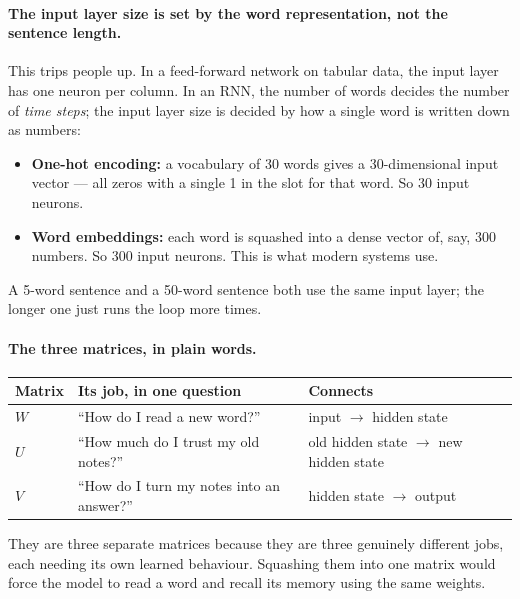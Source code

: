 \documentclass[11pt,a4paper]{article}
\begin{document}
\paragraph{The input layer size is set by the word representation, not the sentence length.}
This trips people up. In a feed-forward network on tabular data, the input layer has one
neuron per column. In an RNN, the number of words decides the number of \emph{time steps};
the input layer size is decided by how a single word is written down as numbers:
\begin{itemize}
\item \textbf{One-hot encoding:} a vocabulary of 30 words gives a 30-dimensional input
  vector --- all zeros with a single 1 in the slot for that word. So 30 input neurons.
\item \textbf{Word embeddings:} each word is squashed into a dense vector of, say, 300
  numbers. So 300 input neurons. This is what modern systems use.
\end{itemize}
A 5-word sentence and a 50-word sentence both use the same input layer; the longer one just
runs the loop more times.

\paragraph{The three matrices, in plain words.}
\begin{center}
\begin{tabularx}{\textwidth}{lYY}
\textbf{Matrix} & \textbf{Its job, in one question} & \textbf{Connects} \\
\hline
$W$ & ``How do I read a new word?'' & input $\rightarrow$ hidden state \\
$U$ & ``How much do I trust my old notes?'' & old hidden state $\rightarrow$ new hidden state \\
$V$ & ``How do I turn my notes into an answer?'' & hidden state $\rightarrow$ output \\
\end{tabularx}
\end{center}
They are three separate matrices because they are three genuinely different jobs, each
needing its own learned behaviour. Squashing them into one matrix would force the model to
read a word and recall its memory using the same weights.
\end{document}
